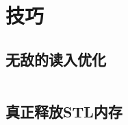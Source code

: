 \chapter{技巧}
\section{无敌的读入优化}
\inputminted{cpp}{\source/hints/input-acceleration.cpp}
\section{真正释放STL内存}
\inputminted{cpp}{\source/hints/STL-memory-release.cpp}